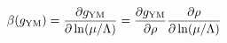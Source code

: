 \begin{equation} 
\beta(g_{\rm YM}) = \frac{\partial g_{\rm YM}}{\partial \ln
(\mu/\Lambda)} = \frac{\partial g_{\rm YM}}{\partial
\rho}\frac{\partial \rho}{\partial \ln (\mu/\Lambda)}
\end{equation} 
